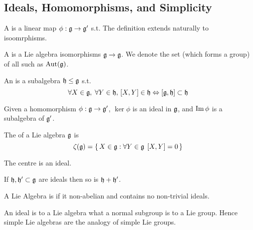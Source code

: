 \documentclass{article}
\begin{document}
\subsection{Ideals, Homomorphisms, and Simplicity}

\begin{definition}
	A  is a linear map $\phi : \mf{g} \to \mf{g}^\prime$ s.t. 
The definition extends naturally to isoomrphisms.   
\end{definition}

\begin{definition}
	A  is a Lie algebra isomorphisms $\mf{g} \to \mf{g}$. We denote the set (which forms a group) of all such as $\Aut(\mf{g})$.
\end{definition}


\begin{definition}[ideal]
	An  is a subalgebra $\mf{h} \leq \mf{g}$ s.t.
	\[
	\forall X\in\mf{g}, \; \forall Y\in\mf{h}, \,  \comm[X]{Y}\in\mf{h} \Leftrightarrow \comm[\mf{g}]{\mf{h}} \subset \mf{h}
	\]
\end{definition}

\begin{prop}
	Given a homomorphism $\phi : \mf{g} \to \mf{g}^\prime$, $\ker\phi$ is an ideal in $\mf{g}$, and $\image\phi$ is a subalgebra of $\mf{g}^\prime$.
\end{prop}

\begin{definition}[Centre]
	The  of a Lie algebra $\mf{g}$ is 
	\[
	\zeta(\mf{g})=\set{X\in\mf{g} : \forall Y\in\mf{g} \; \comm[X]{Y}=0}
	\]
\end{definition}

\begin{prop}
	The centre is an ideal.
\end{prop}

\begin{prop}
	If $\mf{h},\mf{h}^\prime \subset \mf{g}$ are ideals then so is $\mf{h}+\mf{h}^\prime$. 
\end{prop}

\begin{definition}
	A Lie Algebra is  if it non-abelian and contains no non-trivial ideals.
\end{definition}

\begin{idea}
	An ideal is to a Lie algebra what a normal subgroup is to a Lie group. Hence simple Lie algebras are the analogy of simple Lie groups.  
\end{idea}
\end{document}
